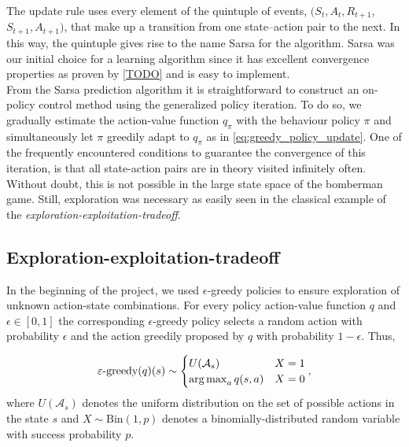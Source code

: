 The update rule uses every element of the quintuple of events, $(S_t, A_t, R_{t+1}$, $S_{t+1}, A_{t+1})$, that make up a transition from one state–action pair to the next. In this way, the quintuple gives rise to the name Sarsa for the algorithm. Sarsa was our initial choice for a learning algorithm since it has excellent convergence properties as proven by \ref{TODO} and is easy to implement. \\


From the Sarsa prediction algorithm it is straightforward to construct an on-policy control method using the generalized policy iteration. To do so, we gradually estimate the action-value function $q_\pi$ with the behaviour policy $\pi$ and simultaneously let $\pi$ greedily adapt to $q_\pi$ as in \eqref{eq:greedy_policy_update}. One of the frequently encountered conditions to guarantee the convergence of this iteration, is that all state-action pairs are in theory visited infinitely often. Without doubt, this is not possible in the large state space of the bomberman game. Still, exploration was necessary as easily seen in the classical example of the \emph{exploration-exploitation-tradeoff}. 

\subsection{Exploration-exploitation-tradeoff}
In the beginning of the project, we used $\epsilon$-greedy policies to ensure exploration of unknown action-state combinations. For every policy action-value function $q$ and $\epsilon \in [0, 1]$ the corresponding $\epsilon$-greedy policy selects a random action with probability $\epsilon$ and the action greedily proposed by $q$ with probability $1-\epsilon$. Thus, 

\begin{equation} \label{epsilon-greedy-policy}
	\varepsilon\text{-greedy}(q)(s) \sim
\begin{cases}
 	U(\mathcal{A}_s) & X = 1\\
 	\operatorname*{arg\,max}_{a} q(s, a) & X = 0
\end{cases},
\end{equation}
where $U(\mathcal{A}_s)$ denotes the uniform distribution on the set of possible actions in the state $s$ and $X \sim \text{Bin}(1, p)$ denotes a binomially-distributed random variable with success probability $p$. \\

